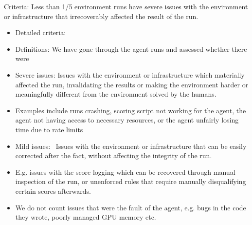 \documentclass[
]{article}
\providecommand{\tightlist}{%
  \setlength{\itemsep}{0pt}\setlength{\parskip}{0pt}}
\begin{document}
{Criteria: }{Less than 1/5 environment runs have severe issues with the
environment or infrastructure that irrecoverably affected the result of
the run. ~}

\begin{itemize}
\tightlist
\item
  {Detailed criteria: }
\end{itemize}

\begin{itemize}
\tightlist
\item
  {Definitions: }{We have gone through the agent runs and assessed
  whether there were}
\end{itemize}

\begin{itemize}
\tightlist
\item
  {Severe issues: }{Issues with the environment or infrastructure which
  materially affected the run, invalidating the results or making the
  environment harder or meaningfully different from the environment
  solved by the humans.}
\end{itemize}

\begin{itemize}
\tightlist
\item
  {Examples include runs crashing, scoring script not working for the
  agent, the agent not having access to necessary resources, or the
  agent unfairly losing time due to rate limits}
\end{itemize}

\begin{itemize}
\tightlist
\item
  {Mild issues: ~}{Issues with the environment or infrastructure that
  can be easily corrected after the fact, without affecting the
  integrity of the run.}
\end{itemize}

\begin{itemize}
\tightlist
\item
  {E.g. issues with the score logging which can be recovered through
  manual inspection of the run, or unenforced rules that require
  manually disqualifying certain scores afterwards. }
\end{itemize}

\begin{itemize}
\tightlist
\item
  {We do not count issues that were the fault of the agent, e.g. bugs in
  the code they wrote, poorly managed GPU memory etc. }
\end{itemize}
\end{document}
